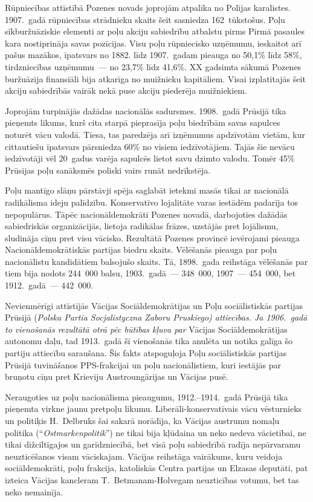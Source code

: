 \documentclass[twoside,a5paper,12pt,fleqn,openany]{extbook}
\newcommand{\pltxti}[1]{\textit{\textpolish{#1}}}
\newcommand{\detxti}[1]{\textit{\textgerman{#1}}}
\begin{document}
Rūpniecības attīstībā Pozenes novads joprojām atpalika no Polijas karalistes. 1907.~gadā rūpniecības strādnieku skaits šeit sasniedza 162~tūkstošus. Poļu sīkburžuāziskie elementi ar poļu akciju sabiedrību atbalstu pirms Pirmā pasaules kara nostiprināja savas pozīcijas. Visu poļu rūpniecisko uzņēmumu, ieskaitot arī pašus mazākos, īpatsvars no 1882. līdz 1907.~gadam pieauga no 50,1\% līdz 58\%, tirdzniecības uzņēmumu~--- no 23,7\% līdz 41,6\%. XX gadsimta sākumā Pozenes buržuāzija finansiāli bija atkarīga no muižnieku kapitāliem. Visai izplatītajās šeit akciju sabiedrībās vairāk nekā puse akciju piederēja muižniekiem.

Joprojām turpinājās dažādas nacionālās sadursmes. 1908.~gadā Prūsijā tika pieņemts likums, kurš cita starpā pieprasīja poļu biedrībām savas sapulces noturēt vācu valodā. Tiesa, tas paredzēja arī izņēmumus apdzīvotām vietām, kur cittautiešu īpatsvars pārsniedza 60\% no visiem iedzīvotājiem. Tajās šie nevācu iedzīvotāji vēl 20~gadus varēja sapulcēs lietot savu dzimto valodu. Tomēr 45\% Prūsijas poļu sanāksmēs poliski vairs runāt nedrīkstēja.

Poļu mantīgo slāņu pārstāvji spēja saglabāt ietekmi masās tikai ar nacionālā radikālisma ideju palīdzību. Konservatīvo lojalitāte varas iestādēm padarīja tos nepopulārus. Tāpēc nacionāldemokrāti Pozenes novadā, darbojoties dažādās sabiedriskās organizācijās, lietoja radikālas frāzes, uzstājās pret lojālismu, sludināja cīņu pret visu vācisko. Rezultātā Pozenes provincē ievērojami pieauga Nacionāldemokrātiskās partijas biedru skaits. Vēlēšanās pieauga par poļu nacionālistu kandidātiem balsojušo skaits. Tā, 1898.~gada reihstāga vēlēšanās par tiem bija nodots 244~000 balsu, 1903.~gadā~--- 348~000, 1907~--- 454~000, bet 1912.~gadā~--- 442~000.

Nevienmērīgi attīstījās Vācijas Sociāldemokrātijas un Poļu sociālistiskās partijas Prūsijā (\pltxti{Polska Partia Socjalistyczna Zaboru Pruskiego) attiecības. Ja 1906.~gadā to vienošanās rezultātā otrā pēc būtības kļuva par} Vācijas Sociāldemokrātijas autonomu daļu, tad 1913.~gadā šī vienošanās tika anulēta un notika galīga šo partiju attiecību saraušana. Šis fakts atspoguļoja Poļu sociālistiskās partijas Prūsijā tuvināšanos PPS-frakcijai un poļu nacionālistiem, kuri iestājās par bruņotu cīņu pret Krieviju Austroungārijas un Vācijas pusē.

Neraugoties uz poļu nacionālisma pieaugumu, 1912.--1914.~gadā Prūsijā tika pieņemta virkne jaunu pretpoļu likumu. Liberāli-konservatīvais vācu vēsturnieks un politiķis H.~Delbruks šai sakarā norādīja, ka Vācijas austrumu nomaļu politika (``\detxti{Ostmarkenpolitik}'') ne tikai bija kļūdaina un neko nedeva vācietībai, ne tikai dižciltīgajos un garīdzniecībā, bet visā poļu sabiedrībā radīja nepārvaramu neuzticēšanos visam vāciskajam. Vācijas reihstāga vairākums, kuru veidoja sociāldemokrāti, poļu frakcija, katoliskās Centra partijas un Elzasas deputāti, pat izteica Vācijas kancleram T.~Betmanam-Holvegam neuzticības votumu, bet tas neko nemainīja.
\end{document}
